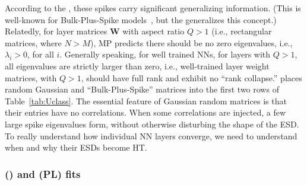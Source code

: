 According to the \HTSR \Phenomenology, these spikes carry significant generalizing information. 
(This is well-known for Bulk-Plus-Spike models~\cite{MM18_TR_JMLRversion}, but the \HTSR \Phenomenology generalizes this concept.)
%
Relatedly, for layer matrices $\mathbf{W}$ with aspect ratio $Q>1$ (i.e., rectangular matrices, where $N>M$), MP \RMT predicts there should be no zero eigenvalues, i.e., $\lambda_i>0$, for all $i$. 
Generally speaking, for well trained NNs, for layers with $Q>1$, all eigenvalues are strictly larger than zero, i.e., 
well-trained layer weight matrices, with $Q>1$, should have full rank and exhibit no ``rank collapse.'' 
\HTSR places random Gaussian and ``Bulk-Plus-Spike'' matrices into the first two rows of Table~\ref{tab:Uclass}.
The essential feature of Gaussian random matrices is that their entries have no correlations. 
When some correlations are injected, a few large spike eigenvalues form, without otherwise disturbing the shape of the ESD. 
To really understand how individual NN layers converge, we need to understand when and why their ESDs become HT.

%


\subsubsection{\HeavyTailed \RandomMatrixTheory (\HTRMT) and \PowerLaw (PL) fits}
\label{sxn:htsr_pl_fits}

